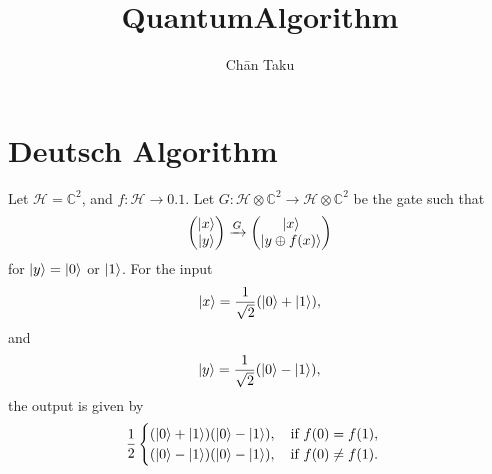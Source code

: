 \documentclass{article}
\title{QuantumAlgorithm}
\author{Ch\=an Taku}
\begin{document}
\maketitle

\section{Deutsch Algorithm}

Let $\mathcal{H} = \mathbb{C}^2$, and $f: \mathcal{H} \rightarrow \qty{0,1}$.
Let $G: \mathcal{H}\otimes \mathbb{C}^2 \rightarrow \mathcal{H}\otimes \mathbb{C}^2 $ be the gate such that
\[ \begin{pmatrix}
    \ket{x} \\ \ket{y}
\end{pmatrix} \xrightarrow{G} \begin{pmatrix}
    \ket{x} \\
    \ket{y \oplus f(x)}
\end{pmatrix} \]
for $\ket{y} = \ket{0}$ or $\ket{1}$.
For the input
\[ \ket{x} = \frac{1}{\sqrt{2}} \qty(\ket{0} + \ket{1}), \]
and
\[ \ket{y} = \frac{1}{\sqrt{2}} \qty(\ket{0} - \ket{1}), \]
the output is given by
\[ \frac{1}{2} \begin{cases}
    \qty(\ket{0} + \ket{1})\qty(\ket{0} - \ket{1}),\quad \text{if } f(0) = f(1), \\
    \qty(\ket{0} - \ket{1})\qty(\ket{0} - \ket{1}),\quad \text{if } f(0) \neq f(1).
\end{cases} \]

% 
% 
\end{document}
